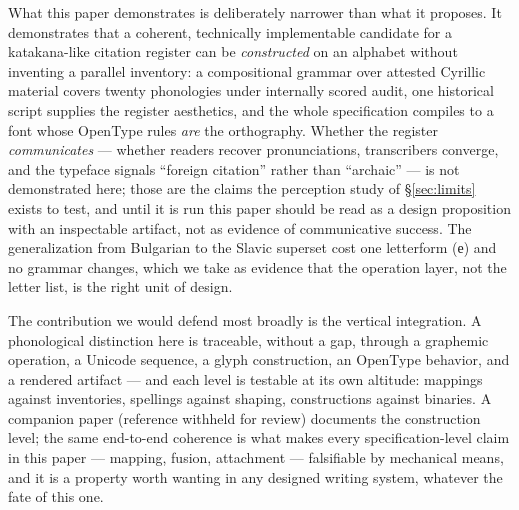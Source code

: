 \documentclass[12pt]{article}
\begin{document}
What this paper demonstrates is deliberately narrower than what it proposes. It demonstrates that a coherent, technically implementable candidate for a katakana-like citation register can be \emph{constructed} on an alphabet without inventing a parallel inventory: a compositional grammar over attested Cyrillic material covers twenty phonologies under internally scored audit, one historical script supplies the register aesthetics, and the whole specification compiles to a font whose OpenType rules \emph{are} the orthography. Whether the register \emph{communicates} — whether readers recover pronunciations, transcribers converge, and the typeface signals ``foreign citation'' rather than ``archaic'' — is not demonstrated here; those are the claims the perception study of \S\ref{sec:limits} exists to test, and until it is run this paper should be read as a design proposition with an inspectable artifact, not as evidence of communicative success. The generalization from Bulgarian to the Slavic superset cost one letterform (е) and no grammar changes, which we take as evidence that the operation layer, not the letter list, is the right unit of design.

The contribution we would defend most broadly is the vertical integration. A phonological distinction here is traceable, without a gap, through a graphemic operation, a Unicode sequence, a glyph construction, an OpenType behavior, and a rendered artifact — and each level is testable at its own altitude: mappings against inventories, spellings against shaping, constructions against binaries. A companion paper (reference withheld for review) documents the construction level; the same end-to-end coherence is what makes every specification-level claim in this paper — mapping, fusion, attachment — falsifiable by mechanical means, and it is a property worth wanting in any designed writing system, whatever the fate of this one.
\end{document}
